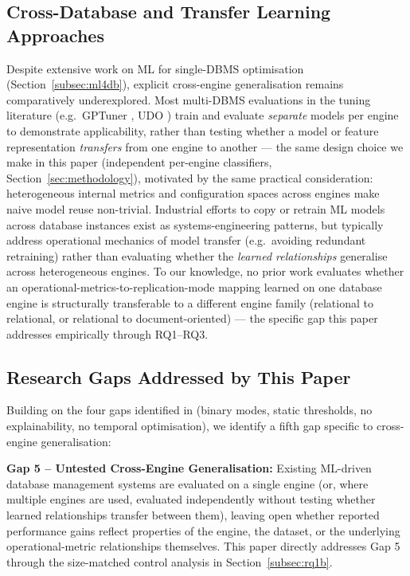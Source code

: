\documentclass[pdflatex,sn-mathphys-num]{sn-jnl}
\theoremstyle{thmstyleone}
\theoremstyle{thmstylethree}
\begin{document}
\subsection{Cross-Database and Transfer Learning Approaches}\label{subsec:crossdb}

Despite extensive work on ML for single-DBMS optimisation
(Section~\ref{subsec:ml4db}), explicit cross-engine generalisation
remains comparatively underexplored. Most multi-DBMS evaluations in
the tuning literature (e.g.\ GPTuner \cite{lao2024},
UDO \cite{wang2021udo}) train and evaluate \emph{separate} models per
engine to demonstrate applicability, rather than testing whether a
model or feature representation \emph{transfers} from one engine to
another --- the same design choice we make in this paper (independent
per-engine classifiers, Section~\ref{sec:methodology}), motivated by
the same practical consideration: heterogeneous internal metrics and
configuration spaces across engines make naive model reuse
non-trivial. Industrial efforts to copy or retrain ML models across
database instances exist as systems-engineering patterns, but
typically address operational mechanics of model transfer (e.g.\
avoiding redundant retraining) rather than evaluating whether the
\emph{learned relationships} generalise across heterogeneous engines.
To our knowledge, no prior work evaluates whether an
operational-metrics-to-replication-mode mapping learned on one
database engine is structurally transferable to a different
engine family (relational to relational, or relational to
document-oriented) --- the specific gap this paper addresses
empirically through RQ1--RQ3.

\subsection{Research Gaps Addressed by This Paper}\label{subsec:gaps}

Building on the four gaps identified in \cite{iaha2026} (binary modes,
static thresholds, no explainability, no temporal optimisation), we
identify a fifth gap specific to cross-engine generalisation:

\textbf{Gap 5 -- Untested Cross-Engine Generalisation:} Existing
ML-driven database management systems are evaluated on a single engine
(or, where multiple engines are used, evaluated independently without
testing whether learned relationships transfer between them), leaving
open whether reported performance gains reflect properties of the
engine, the dataset, or the underlying operational-metric relationships
themselves. This paper directly addresses Gap 5 through the
size-matched control analysis in Section~\ref{subsec:rq1b}.
\end{document}

